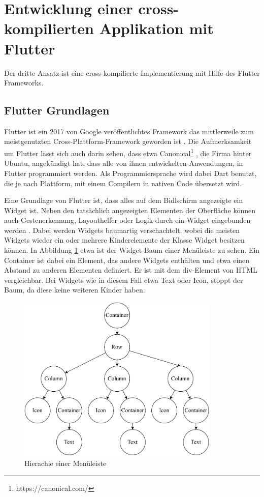 \section{Entwicklung einer cross-kompilierten Applikation mit Flutter}
Der dritte Ansatz ist eine cross-kompilierte Implementierung mit Hilfe des Flutter Frameworks.

\subsection{Flutter Grundlagen}
Flutter ist ein 2017 von Google veröffentlichtes Framework das mittlerweile zum meistgenutzten Cross-Plattform-Framework geworden ist \cite{statist_CP_Framework}. Die Aufmerksamkeit um Flutter lässt sich auch darin sehen, dass etwa Canonical\footnote{https://canonical.com/} , die Firma hinter Ubuntu, angekündigt hat, dass alle von ihnen entwickelten Anwendungen, in Flutter programmiert werden\cite{Ubuntu_Flutter}. Als Programmiersprache wird dabei Dart benutzt, die je nach Plattform, mit einem Compilern in nativen Code übersetzt wird.

Eine Grundlage von Flutter ist, dass alles auf dem Bidlschirm angezeigte ein Widget ist. Neben den tatsächlich angezeigten Elementen der Oberfläche können auch Gestenerkennung, Layouthelfer oder Logik durch ein Widget eingebunden werden \cite{Thiele_2018}. Dabei werden Widgets baumartig verschachtelt, wobei die meisten Widgets wieder ein oder mehrere Kinderelemente der Klasse Widget besitzen können. In Abbildung \ref{fig:flutter_layout_tree} etwa ist der Widget-Baum einer Menüleiste zu sehen. Ein Container ist dabei ein Element, das andere Widgets enthälten und etwa einen Abstand zu anderen Elementen definiert. Er ist mit dem div-Element von HTML vergleichbar. Bei Widgets wie in diesem Fall etwa Text oder Icon, stoppt der Baum, da diese keine weiteren Kinder haben.

\begin{figure}[ht]
  \centering
  \includegraphics[height=8cm,keepaspectratio]{images/Flutter_menu_replacement.drawio.pdf} 
  \caption[Hierachie einer Menüleiste]{Hierachie einer Menüleiste\protect\footnotemark}
  \label{fig:flutter_layout_tree}
\end{figure}

